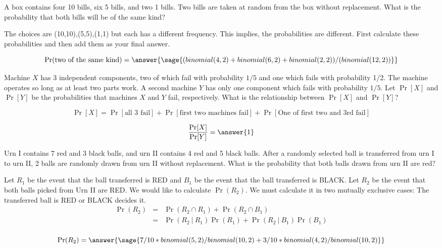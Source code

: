 \documentclass{ximera}
\begin{document}
\begin{problem}
A box contains four 10 bills, six 5 bills, and two 1 bills. Two bills are taken at random from the box without replacement. What is the probability that both bills will be of the same kind? 
\begin{hint}
The choices are (10,10),(5,5),(1,1) but each has a different frequency. This implies, the probabilities are different. First calculate these probabilities and then add them as your final answer.
\end{hint}

\begin{prompt}
$$ 
\Pr(\text{two of the same kind}) =\answer{\sage{(binomial(4,2)+binomial(6,2)+binomial(2,2))/(binomial(12,2))}}
$$
\end{prompt}
\end{problem}


\begin{problem}
Machine $X$ has 3 independent components, two of which fail with probability $1/5$ and one which fails with probability 1/2. The machine operates so long as at least two parts work. A second machine $Y$ has only one component which fails with probability $1/5$. Let $\Pr[X]$ and $\Pr[Y]$ be the probabilities that machines $X$ and $Y$ fail, respectively. What is the relationship between $\Pr[X]$ and $\Pr[Y]$? 

\begin{hint}
$$
\Pr[X]=\Pr[\text{all 3 fail}]+\Pr[\text{first two machines fail}]+\Pr[\text{One of first two and 3rd fail}] 
$$
\end{hint}

\begin{prompt}
        $$\frac{\Pr[X]}{\Pr[Y]}=\answer{1} $$
\end{prompt}
\end{problem}

\begin{problem}
Urn I contains 7 red and 3 black balls, and urn II contains 4 red and 5 black balls. After a randomly selected ball is transferred from urn I to urn II, 2 balls are randomly drawn from urn II without replacement. What is the probability that both balls drawn from urn II are red? 
\begin{hint}
Let $R_1$ be the event that the ball transferred is RED and $B_1$ be the event that the ball transferred is BLACK. Let $R_2$ be the event that both balls picked from Urn II are RED. We would like to calculate $\Pr(R_2)$. We must calculate it in two mutually exclusive cases: The transferred ball is RED or BLACK decides it. 
\begin{eqnarray*} 
\Pr(R_2)
&=&\Pr(R_2\cap R_1)+\Pr(R_2\cap B_1) \\
&=&\Pr(R_2 ~|~ R_1)\Pr(R_1)+\Pr(R_2~|~ B_1)\Pr(B_1) \\
\end{eqnarray*} 
\end{hint}

\begin{prompt}
$$\Pr(R_2)=\answer{\sage{7/10*binomial(5,2)/binomial(10,2)+3/10*binomial(4,2)/binomial(10,2)}}
$$
\end{prompt}

\end{problem}
\end{document}

